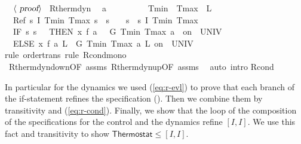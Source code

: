 \documentclass[envcountsame]{llncs}
\begin{document}
\begin{example}
\begin{isabellebody}
\ \ $\langle \isa{proof}\rangle$\isanewline
\isanewline
{}\isamarkupfalse%
\ R{\isacharunderscore}therm{\isacharunderscore}dyn{\isacharcolon}\isanewline
\ \ {\isachardoublequoteopen}a\ {\isachargreater}\ {}{\isachardoublequoteclose}\ \ {\isachardoublequoteopen}{}\ {\isasymle}\ {\isasymtau}{\isachardoublequoteclose}\ \ {\isachardoublequoteopen}{}\ {\isacharless}\ Tmin{\isachardoublequoteclose}\ \ {\isachardoublequoteopen}Tmax\ {\isacharless}\ L{\isachardoublequoteclose}\isanewline
\ \ {\isachardoublequoteopen}Ref\ {\isasymlceil}{\isasymlambda}s{\isachardot}\ I\ Tmin\ Tmax\ s\ {\isasymand}\ s{\isachardollar}{}\ {\isacharequal}\ {}\ {\isasymand}\ s{\isachardollar}{}\ {\isacharequal}\ s{\isachardollar}{}{\isasymrceil}\ {\isasymlceil}I\ Tmin\ Tmax{\isasymrceil}\ {\isasymge}\ \isanewline
\ \ {\isacharparenleft}IF\ {\isacharparenleft}{\isasymlambda}s{\isachardot}\ s{\isachardollar}{}\ {\isacharequal}\ {}{\isacharparenright}\ THEN\ {\isacharparenleft}x{\isasymacute}{\isacharequal}\ f\ a\ {}\ {\isacharampersand}\ G\ Tmin\ Tmax\ a\ {}\ on\ {\isacharbraceleft}{}{\isachardot}{\isachardot}{\isasymtau}{\isacharbraceright}\ UNIV\ {\isacharat}\ {}{\isacharparenright}\ \isanewline
\ \ ELSE\ {\isacharparenleft}x{\isasymacute}{\isacharequal}\ f\ a\ L\ {\isacharampersand}\ G\ Tmin\ Tmax\ a\ L\ on\ {\isacharbraceleft}{}{\isachardot}{\isachardot}{\isasymtau}{\isacharbraceright}\ UNIV\ {\isacharat}\ {}{\isacharparenright}{\isacharparenright}{\isachardoublequoteclose}\isanewline
\ \isamarkupfalse%
{\isacharparenleft}rule\ order{\isacharunderscore}trans{\isacharcomma}\ rule\ R{\isacharunderscore }cond{\isacharunderscore}mono{\isacharparenright}\isanewline
\ \isamarkupfalse%
\ R{\isacharunderscore}therm{\isacharunderscore}dyn{\isacharunderscore}down{\isacharbrackleft}OF\ assms{\isacharbrackright}\ R{\isacharunderscore}therm{\isacharunderscore}dyn{\isacharunderscore}up{\isacharbrackleft}OF\ assms{\isacharbrackright}\ \isamarkupfalse%
\ {\isacharparenleft}auto\ intro{\isacharcolon} R{\isacharunderscore}cond{\isacharparenright}\isanewline
\end{isabellebody}

In particular for the dynamics we used (\ref{eq:r-evl}) to prove that each branch of the if-statement refines the specification (). Then we combine them by transitivity and (\ref{eq:r-cond}). Finally, we show that the loop of the composition of the specifications for the control and the dynamics refine $[I,I]$. We use this fact and transitivity to show $\mathsf{Thermostat}\leq [I,I]$.


\end{example}
\end{document}
